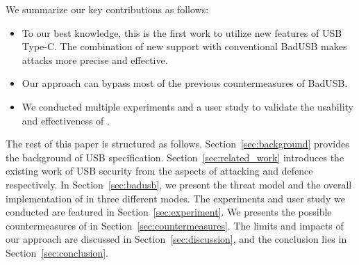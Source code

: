 We summarize our key contributions as follows:
\begin{itemize}
	\item To our best knowledge, this is the first work to utilize new features of USB Type-C.
	The combination of new support with conventional BadUSB makes attacks more precise and effective.
	\item Our approach can bypass most of the previous countermeasures of BadUSB.
	\item We conducted multiple experiments and a user study to validate the usability and effectiveness of \tool. 
\end{itemize}

The rest of this paper is structured as follows.
Section~\ref{sec:background} provides the background of USB specification.
Section~\ref{sec:related_work} introduces the existing work of USB security from the aspects of attacking and defence respectively.
In Section~\ref{sec:badusb}, we present the threat model and the overall implementation of \tool in three different modes.
The experiments and user study we conducted are featured in Section~\ref{sec:experiment}.
We presents the possible countermeasures of \tool in Section~\ref{sec:countermeasures}.
The limits and impacts of our approach are discussed in Section~\ref{sec:discussion}, and the conclusion lies in Section~\ref{sec:conclusion}.














